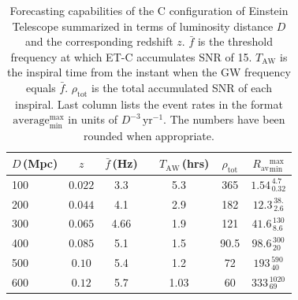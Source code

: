 \documentclass{aa}
\newcommand\T{\rule{0pt}{2.6ex}}       %
\newcommand\B{\rule[-1.2ex]{0pt}{0pt}} %
\begin{document}
%
%
%
%
\begin{table}[h]
\caption{Forecasting capabilities of the C configuration of Einstein Telescope summarized in terms
of luminosity distance $D$ and the corresponding redshift $z$.
$\bar{f}$ is the threshold frequency at which ET-C accumulates SNR of 15.
$T_\text{AW}$ is the inspiral time from the instant when the GW frequency equals $\bar{f}$.
$\rho_\text{tot}$ is the total accumulated SNR of each inspiral.
Last column lists the event rates in the format $\text{average}^\text{max}_\text{min}$ in units of $D^{-3}\,\text{yr}^{-1}$.
The numbers have been rounded when appropriate.}
\label{table:ET}
\centering
\begin{tabular}{lccccc}
\hline\hline
$D\,$(Mpc) &  $z$ & $\bar{f}\,$(Hz) & \ \hspace{1mm} $T_\text{AW}\,$(hrs)& ${\rho}_\text{tot}$ &$ R_\text{av}{}^\text{max}_\text{min}$ \T\B \\
\hline
100 & $ 0.022$ & 3.3 & 5.3 & 365 & $1.54^{\,4.7}_{\,0.32}$\T\B \\
200 & $ 0.044$ & 4.1 & 2.9 & 182 & $12.3^{\,38.}_{\,2.6}$ \T \B \\
300 & $ 0.065$ & 4.66 & 1.9 & 121 & $41.6^{\,130}_{\,8.6}$ \T \B \\
400 & $ 0.085$ & 5.1 & 1.5 & 90.5 & $98.6^{\,300}_{\,20}$ \T \B \\
500 & $ 0.10$ & 5.4 & 1.2 & 72 & $193^{\,590}_{\,40}$ \T \B \\
600 & $ 0.12$ & 5.7 & 1.03 & 60 & $333^{\,1020}_{\,69}$ \T \B \\
\hline\hline
\end{tabular}
\end{table}
%
%
%
%
%
\end{document}
